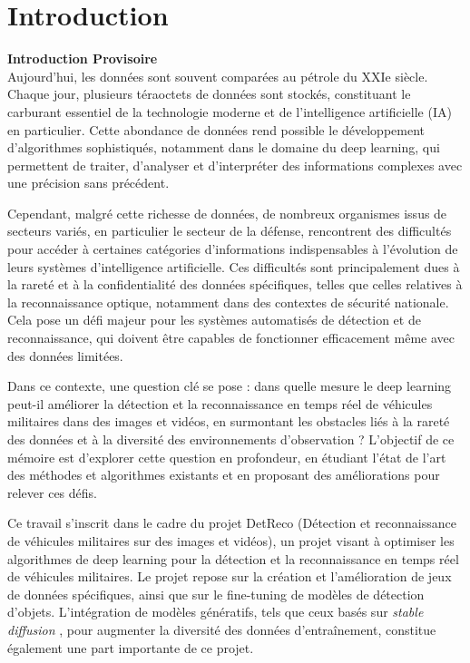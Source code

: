 \chapter{Introduction}
\label{chap:intorduction}
\sloppy

\textbf{Introduction Provisoire}\\

Aujourd’hui, les données sont souvent comparées au pétrole du XXIe siècle.
Chaque jour, plusieurs téraoctets de données sont stockés, constituant le carburant essentiel de la technologie moderne et de l'intelligence artificielle (IA) en particulier.
Cette abondance de données rend possible le développement d'algorithmes sophistiqués, notamment dans le domaine du deep learning, qui permettent de traiter, d'analyser et d'interpréter des informations complexes avec une précision sans précédent.

Cependant, malgré cette richesse de données, de nombreux organismes issus de secteurs variés, en particulier le secteur de la défense, rencontrent des difficultés pour accéder à certaines catégories d’informations indispensables à l'évolution de leurs systèmes d'intelligence artificielle.
Ces difficultés sont principalement dues à la rareté et à la confidentialité des données spécifiques, telles que celles relatives à la reconnaissance optique, notamment dans des contextes de sécurité nationale. Cela pose un défi majeur pour les systèmes automatisés de détection et de reconnaissance, qui doivent être capables de fonctionner efficacement même avec des données limitées.

Dans ce contexte, une question clé se pose : dans quelle mesure le deep learning peut-il améliorer la détection et la reconnaissance en temps réel de véhicules militaires dans des images et vidéos, en surmontant les obstacles liés à la rareté des données et à la diversité des environnements d'observation ?
L’objectif de ce mémoire est d'explorer cette question en profondeur, en étudiant l’état de l’art des méthodes et algorithmes existants et en proposant des améliorations pour relever ces défis.

Ce travail s’inscrit dans le cadre du projet DetReco (Détection et reconnaissance de véhicules militaires sur des images et vidéos), un projet visant à optimiser les algorithmes de deep learning pour la détection et la reconnaissance en temps réel de véhicules militaires.
Le projet repose sur la création et l’amélioration de jeux de données spécifiques, ainsi que sur le fine-tuning de modèles de détection d’objets.
L'intégration de modèles génératifs, tels que ceux basés sur \textit{stable diffusion} , pour augmenter la diversité des données d'entraînement, constitue également une part importante de ce projet.

